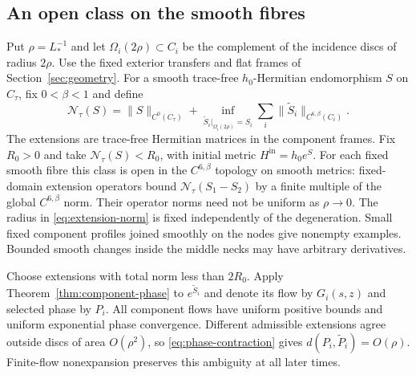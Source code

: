 \subsection{An open class on the smooth fibres}
Put $\rho=L_*^{-1}$ and let
$\Omega_i(2\rho)\subset C_i$ be the complement
of the incidence discs of radius $2\rho$.
Use the fixed exterior transfers and flat frames
of Section~\ref{sec:geometry}.
For a smooth trace-free $h_0$-Hermitian
endomorphism $S$ on $C_\tau$, fix $0<\beta<1$
and define
\begin{equation}\label{eq:extension-norm}
 \mathcal N_\tau(S)=\|S\|_{C^0(C_\tau)}
 +\inf_{\widetilde S_i|_{\Omega_i(2\rho)}=S_i}
             \sum_i\|\widetilde S_i\|_{C^{6,\beta}(C_i)} .
\end{equation}
The extensions are trace-free Hermitian matrices
in the component frames. Fix $R_0>0$ and take
$\mathcal N_\tau(S)<R_0$, with initial metric
$H^{\mathrm{in}}=h_0e^S$.
For each fixed smooth fibre this class is open
in the $C^{6,\beta}$ topology on smooth metrics:
fixed-domain extension operators bound
$\mathcal N_\tau(S_1-S_2)$ by a finite multiple
of the global $C^{6,\beta}$ norm.
Their operator norms need not be uniform as
$\rho\to0$. The radius in
\eqref{eq:extension-norm} is fixed independently
of the degeneration. Small fixed component
profiles joined smoothly on the nodes give
nonempty examples. Bounded smooth changes
inside the middle necks may have arbitrary
derivatives.

Choose extensions with total norm less than
$2R_0$. Apply Theorem~\ref{thm:component-phase}
to $e^{\widetilde S_i}$ and denote its flow by
$G_i(s,z)$ and selected phase by $P_i$.
All component flows have uniform positive
bounds and uniform exponential phase convergence.
Different admissible extensions agree outside
discs of area $O(\rho^2)$, so
\eqref{eq:phase-contraction} gives
$d(P_i,\widetilde P_i)=O(\rho)$.
Finite-flow nonexpansion preserves this
ambiguity at all later times.

